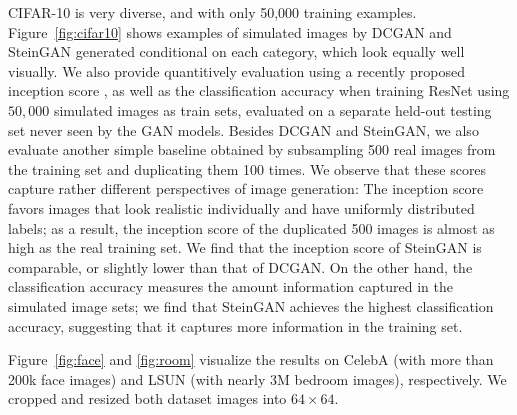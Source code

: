 CIFAR-10 is very diverse, and with only 50,000 training examples.
Figure~\ref{fig:cifar10} shows examples of simulated images by DCGAN and SteinGAN generated conditional on each category, which look equally well visually. 
We also provide quantitively evaluation using a recently proposed inception score \citep{salimans2016improved}, as well as 
the classification accuracy when training ResNet using $50,000$ simulated images as train sets, evaluated on a separate held-out testing set never seen by the GAN models.  
Besides DCGAN and SteinGAN, we also evaluate another simple baseline obtained by subsampling 500 real images from the training set and duplicating them 100 times. 
We observe that these scores capture rather different perspectives of image generation:
The inception score favors images that look realistic individually and have uniformly distributed labels; as a result, 
the inception score of the duplicated 500 images is almost as high as the real training set. 
We find that the inception score of SteinGAN is comparable, or slightly lower than that of DCGAN. 
On the other hand, the classification accuracy measures the amount information captured in the simulated image sets;  
we find that SteinGAN achieves the highest classification accuracy, suggesting that it captures more information in the training set. %

Figure~\ref{fig:face} and \ref{fig:room} visualize the results on CelebA (with more than 200k face images) and LSUN (with nearly 3M bedroom images), respectively. 
We cropped and resized both dataset images into $64\times 64$. 

